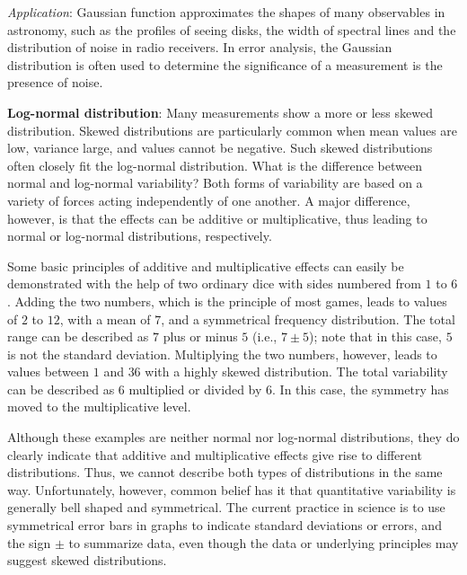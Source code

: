 \documentclass[a4paper,10pt]{article}
\begin{document}
{\noindent}\textit{Application}: Gaussian function approximates the shapes of many observables in astronomy, such as the profiles of seeing disks, the width of spectral lines and the distribution of noise in radio receivers. In error analysis, the Gaussian distribution is often used to determine the significance of a measurement is the presence of noise.

{\noindent}\textbf{Log-normal distribution}: Many measurements show a more or less skewed distribution. Skewed distributions are particularly common when mean values are low, variance large, and values cannot be negative. Such skewed distributions often closely fit the log-normal distribution. What is the difference between normal and log-normal variability? Both forms of variability are based on a variety of forces acting independently of one another. A major difference, however, is that the effects can be additive or multiplicative, thus leading to normal or log-normal distributions, respectively.

{\noindent}Some basic principles of additive and multiplicative effects can easily be demonstrated with the help of two ordinary dice with sides numbered from $1$ to $6$. Adding the two numbers, which is the principle of most games, leads to values of $2$ to $12$, with a mean of $7$, and a symmetrical frequency distribution. The total range can be described as $7$ plus or minus $5$ (i.e., $7\pm5$); note that in this case, $5$ is not the standard deviation. Multiplying the two numbers, however, leads to values between $1$ and $36$ with a highly skewed distribution. The total variability can be described as $6$ multiplied or divided by $6$. In this case, the symmetry has moved to the multiplicative level.

{\noindent}Although these examples are neither normal nor log-normal distributions, they do clearly indicate that additive and multiplicative effects give rise to different distributions. Thus, we cannot describe both types of distributions in the same way. Unfortunately, however, common belief has it that quantitative variability is generally bell shaped and symmetrical. The current practice in science is to use symmetrical error bars in graphs to indicate standard deviations or errors, and the sign $\pm$ to summarize data, even though the data or underlying principles may suggest skewed distributions.
\end{document}

